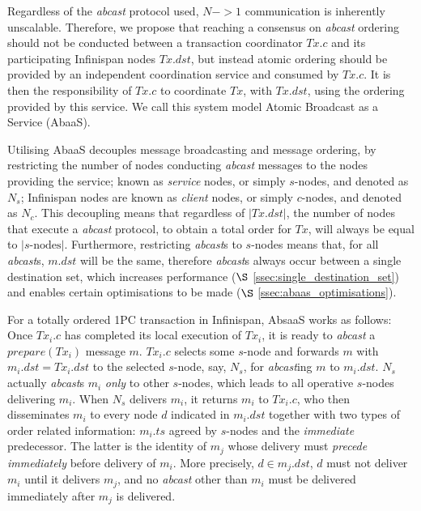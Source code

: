 Regardless of the \emph{abcast} protocol used, $N->1$ communication is inherently unscalable.  Therefore, we propose that reaching a consensus on \emph{abcast} ordering should not be conducted between a transaction coordinator $Tx.c$ and its participating Infinispan nodes $Tx.dst$, but instead atomic ordering should be provided by an independent coordination service and consumed by $Tx.c$.  It is then the responsibility of $Tx.c$ to coordinate $Tx$, with $Tx.dst$, using the ordering provided by this service.  We call this system model Atomic Broadcast as a Service (\textsf{AbaaS}).  

Utilising \textsf{AbaaS} decouples message broadcasting and message ordering, by restricting the number of nodes conducting \emph{abcast} messages to the nodes providing the service; known as \emph{service} nodes, or simply $s$-nodes, and denoted as $N_s$; Infinispan nodes are known as \emph{client} nodes, or simply $c$-nodes, and denoted as $N_c$.  This decoupling means that regardless of $\left\vert Tx.dst \right\vert$, the number of nodes that execute a \emph{abcast} protocol, to obtain a total order for $Tx$, will always be equal to $\left\vert s\text{-nodes}\right\vert$.  Furthermore, restricting \emph{abcast}s to $s$-nodes means that, for all \emph{abcast}s, $m.dst$ will be the same, therefore \emph{abcast}s always occur between a single destination set, which increases performance ($\S$ \ref{ssec:single_destination_set}) and enables certain optimisations to be made ($\S$ \ref{ssec:abaas_optimisations}).  

For a totally ordered 1PC transaction in Infinispan, \textsf{AbsaaS} works as follows: Once $Tx_i.c$ has completed its local execution of $Tx_i$, it is ready to \emph{abcast} a $prepare(Tx_i)$ message $m$.  $Tx_i.c$ selects some $s$-node and forwards $m$ with $m_i.dst = Tx_i.dst$ to the selected $s$-node, say, $N_s$, for \emph{abcast}ing $m$ to $m_i.dst$. $N_s$ actually \emph{abcast}s $m_i$ \emph{only} to other $s$-nodes, which leads to all operative $s$-nodes delivering $m_i$. When $N_s$ delivers $m_i$, it returns $m_i$ to $Tx_i.c$, who then disseminates $m_i$ to every node $d$ indicated in $m_i.dst$ together with two types of order related information: $m_i.ts$ agreed by $s$-nodes and the \emph{immediate} predecessor. The latter is the identity of $m_j$ whose delivery must \emph{precede} \emph{immediately} before delivery of $m_i$. More precisely, $d \in m_j.dst$, $d$ must not deliver $m_i$ until it delivers $m_j$, and no \emph{abcast} other than $m_i$ must be delivered immediately after $m_j$ is delivered.

